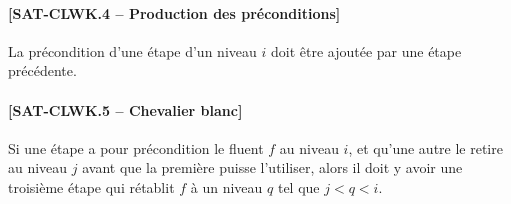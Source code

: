 \paragraph*{[SAT-CLWK.4 -- Production des préconditions]} La précondition d'une étape d'un niveau
  $i$ doit être ajoutée par une étape précédente.

\paragraph*{[SAT-CLWK.5 -- Chevalier blanc]} Si une étape a pour précondition le fluent $f$
  au niveau $i$, et qu'une autre le retire au niveau $j$ avant que la première
  puisse l'utiliser, alors il doit y avoir une troisième étape qui rétablit $f$
  à un niveau $q$ tel que $j < q < i$.

